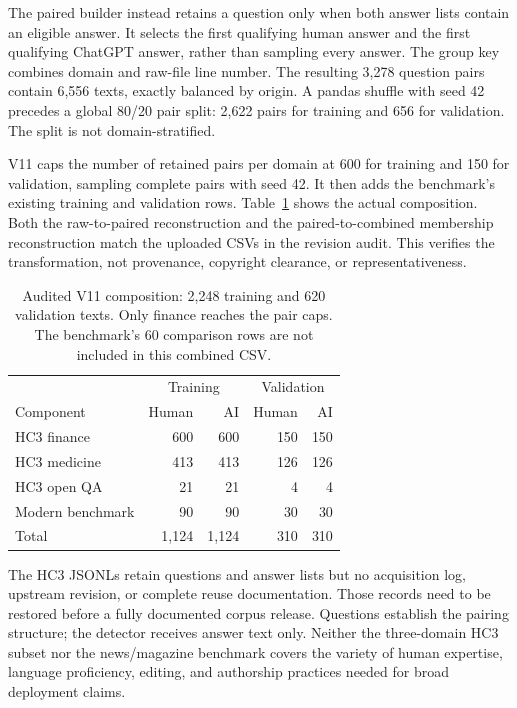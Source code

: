 \documentclass[11pt]{article}
\begin{document}
The paired builder instead retains a question only when both answer lists
contain an eligible answer. It selects the first qualifying human answer and
the first qualifying ChatGPT answer, rather than sampling every answer. The
group key combines domain and raw-file line number. The resulting 3,278
question pairs contain 6,556 texts, exactly balanced by origin. A pandas shuffle
with seed 42 precedes a global 80/20 pair split: 2,622 pairs for training and
656 for validation. The split is not domain-stratified.

V11 caps the number of retained pairs per domain at 600 for training and 150
for validation, sampling complete pairs with seed 42. It then adds the
benchmark's existing training and validation rows. Table~\ref{tab:corpus}
shows the actual composition. Both the raw-to-paired reconstruction and the
paired-to-combined membership reconstruction match the uploaded CSVs in the
revision audit. This verifies the transformation, not provenance, copyright
clearance, or representativeness.

\begin{table}[htbp]
\centering\small
\begin{tabular}{lrrrr}
\toprule
& \multicolumn{2}{c}{Training} & \multicolumn{2}{c}{Validation} \\
Component & Human & AI & Human & AI \\
\midrule
HC3 finance & 600 & 600 & 150 & 150 \\
HC3 medicine & 413 & 413 & 126 & 126 \\
HC3 open QA & 21 & 21 & 4 & 4 \\
Modern benchmark & 90 & 90 & 30 & 30 \\
\midrule
Total & 1,124 & 1,124 & 310 & 310 \\
\bottomrule
\end{tabular}
\caption{Audited V11 composition: 2,248 training and 620 validation texts.
Only finance reaches the pair caps. The benchmark's 60 comparison rows are
not included in this combined CSV.}
\label{tab:corpus}
\end{table}

The HC3 JSONLs retain questions and answer lists but no acquisition log,
upstream revision, or complete reuse documentation. Those records need to be
restored before a fully documented corpus release. Questions establish the
pairing structure; the detector receives answer text only. Neither the
three-domain HC3 subset nor the news/magazine benchmark covers the variety
of human expertise, language proficiency, editing, and authorship practices
needed for broad deployment claims.
\end{document}

